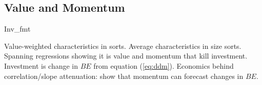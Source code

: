 
\subsection{Value and Momentum}

{Inv_fmt}

Value-weighted characteristics in sorts. Average characteristics in size sorts. Spanning
regressions showing it is value and momentum that kill investment. Investment is change in
$BE$ from equation (\ref{eq:ddm}). Economics behind correlation/slope attenuation:
\textcite{asness2013devil} show that momentum  can forecast changes in $BE$.
